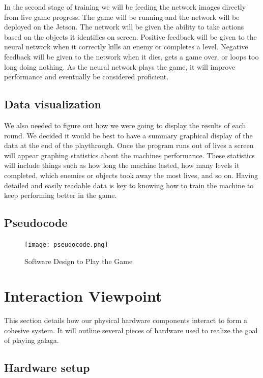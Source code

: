 \documentclass{scrreprt}
\begin{document}
In the second stage of training we will be feeding the network images directly from live game progress.
The game will be running and the network will be deployed on the Jetson.
The network will be given the ability to take actions based on the objects it identifies on screen.
Positive feedback will be given to the neural network when it correctly kills an enemy or completes a level.
Negative feedback will be given to the network when it dies, gets a game over, or loops too long doing nothing.
As the neural network plays the game, it will improve performance and eventually be considered proficient.

\subsection{Data visualization}%

We also needed to figure out how we were going to display the results of each round.
We decided it would be best to have a summary graphical display of the data at the end of the playthrough.
Once the program runs out of lives a screen will appear graphing statistics about the machines performance.
These statistics will include things such as how long the machine lasted, how many levels it completed, which enemies or objects took away the most lives, and so on.
Having detailed and easily readable data is key to knowing how to train the machine to keep performing better in the game.

\subsection{Pseudocode}
\begin{figure}
  \texttt{[image: pseudocode.png]}
  \caption{Software Design to Play the Game}
  \label{fig:3.2}
\end{figure}

\newpage

\section{Interaction Viewpoint}\label{sssec:num1}%

This section details how our physical hardware components interact to form a cohesive system.
It will outline several pieces of hardware used to realize the goal of playing galaga.

\subsection{Hardware setup}%
\end{document}
